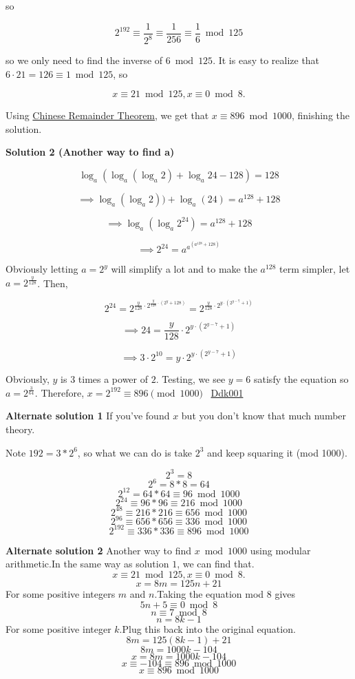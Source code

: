 \begin{enumerate}
 so

 
 \[2^{192} \equiv \frac{1}{2^8} \equiv \frac{1}{256} \equiv \frac{1}{6} \bmod 125\]

 so we only need to find the inverse of $6 \bmod 125$. It is easy to realize that $6\cdot 21 = 126 \equiv 1\bmod 125$, so 

 
 \[x\equiv 21\bmod 125, x\equiv 0\bmod 8.\]

 Using \href{https://artofproblemsolving.com/wiki/index.php?title=Chinese\_Remainder\_Theorem}{Chinese Remainder Theorem}, we get that $x\equiv \boxed{896}\bmod 1000$, finishing the solution.

 



\textbf{Solution 2 (Another way to find a)}


 \[\log_a(\log_a(\log_a 2) + \log_a 24 - 128) = 128\]

 \[\implies \log_a(\log_a 2))+\log_a(24)=a^{128}+128\]

 \[\implies \log_a(\log_a 2^{24})=a^{128}+128\]

 \[\implies 2^{24}=a^{a^{(a^{128}+128)}}\]

 Obviously letting $a=2^y$ will simplify a lot and to make the $a^{128}$ term simpler, let $a=2^{\frac{y}{128}}$. Then, 

 
 \[2^{24}=2^{\frac{y}{128} \cdot 2^{\frac{y}{128} \cdot (2^y+128)}}=2^{\frac{y}{128} \cdot 2^{y \cdot (2^{y-7}+1)}}\]

 \[\implies 24=\frac{y}{128} \cdot 2^{y \cdot (2^{y-7}+1)}\]

 \[\implies 3 \cdot 2^{10}=y \cdot 2^{y \cdot (2^{y-7}+1)}\]

 Obviously, $y$ is $3$ times a power of $2$. Testing, we see $y=6$ satisfy the equation so $a=2^{\frac{3}{64}}$. Therefore, $x=2^{192} \equiv \boxed{896} \pmod{1000}$ ~\href{https://artofproblemsolving.com/wiki/index.php?title=Ddk001}{Ddk001}

 \textbf{Alternate solution 1} If you've found $x$ but you don't know that much number theory.

 Note $192 = 3 * 2^6$, so what we can do is take $2^3$ and keep squaring it (mod 1000).

 
 \[2^3 = 8\]
 \[2^6 = 8*8 = 64\]
 \[2^{12} = 64*64 \equiv 96\bmod 1000\]
 \[2^{24} \equiv 96*96 \equiv 216\bmod 1000\]
 \[2^{48} \equiv 216*216 \equiv 656\bmod 1000\]
 \[2^{96} \equiv 656*656 \equiv 336\bmod 1000\]
 \[2^{192} \equiv 336*336 \equiv \boxed{896}\bmod 1000\]

 \textbf{Alternate solution 2} Another way to find $x \bmod 1000$ using modular arithmetic.In the same way as solution $1$, we can find that.
 \[x\equiv 21\bmod 125, x\equiv 0\bmod 8.\]
 \[x = 8m = 125n+21\] For some positive integers $m$ and $n$.Taking the equation mod $8$ gives 
 \[5n+5 \equiv 0\bmod 8\]
 \[n \equiv 7\bmod 8\]
 \[n = 8k-1\] For some positive integer $k$.Plug this back into the original equation.
 \[8m = 125(8k-1)+21\]
 \[8m = 1000k-104\]
 \[x = 8m = 1000k - 104\]
 \[x \equiv -104 \equiv 896\bmod 1000\]
 \[x \equiv 896\bmod 1000\]


\end{enumerate}
